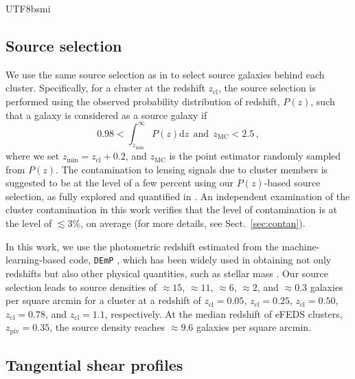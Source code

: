 \documentclass[longauth]{aa}
\newcommand{\redshift}{\ensuremath{z}}
\newcommand{\dif}{\ensuremath{\mathrm{d}}}
\newcommand{\zcl}{\ensuremath{z_{\mathrm{cl}}}}
\newcommand{\ZPIV}{\ensuremath{z_{\mathrm{piv}}}}
\newcommand{\percent}{\ensuremath{\%}}
\begin{document}
\begin{CJK*}{UTF8}{bsmi}
\subsection{Source selection}
\label{sec:source_selection}

We use the same source selection as in \cite{umetsu20} to select source galaxies behind each cluster.
Specifically, for a cluster at the redshift \zcl, the source selection is performed using the observed probability distribution of redshift, $P\left(\redshift\right)$, such that a galaxy is considered as a source galaxy if 
%
\begin{equation}
\label{sec:pzcut}
0.98 < \int_{{\redshift}_{\mathrm{min}}}^{\infty} P\left(\redshift\right)\dif\redshift~~\mathrm{and}~~{\redshift}_{\mathrm{MC}} < 2.5 \, ,
\end{equation}
%
where we set ${\redshift}_{\mathrm{min}} = \zcl + 0.2$, and ${\redshift}_{\mathrm{MC}}$ is the point estimator randomly sampled from $P\left(\redshift\right)$.
The contamination to lensing signals due to cluster members is suggested to be at the level of a few percent using our $P\left(\redshift\right)$-based source selection, as fully explored and quantified in \cite{medezinski18a}.
An independent examination of the cluster contamination in this work verifies that the level of contamination is at the level of $\lesssim3\percent$, on average (for more details, see Sect.~\ref{sec:contan}).

In this work, we use the photometric redshift estimated from the machine-learning-based code, \texttt{DEmP} \citep{hsieh14}, which has been widely used in obtaining not only redshifts but also other physical quantities, such as stellar mass \citep{lin17}.
Our source selection leads to source densities of 
$\approx15$, $\approx11$, $\approx6$, $\approx2$, and $\approx0.3$ galaxies per square arcmin for a cluster at a redshift of 
$\zcl=0.05$, $\zcl=0.25$, $\zcl=0.50$, $\zcl=0.78$, and $\zcl=1.1$, respectively.
At the median redshift of eFEDS clusters, $\ZPIV=0.35$, the source density reaches $\approx9.6$ galaxies per square arcmin.


\subsection{Tangential shear profiles}
\label{sec:gshear}


\end{CJK*}
\end{document}
